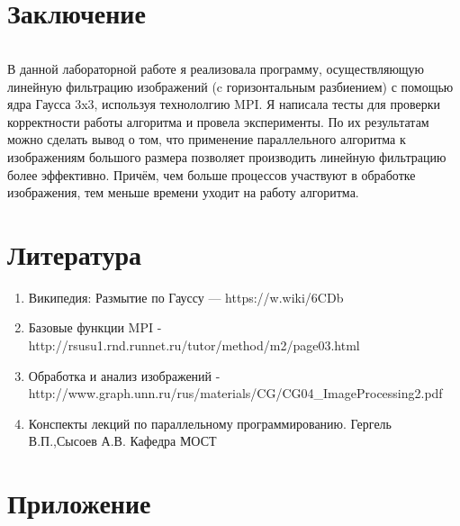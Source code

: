 \documentclass[12pt,a4paper]{article}
\begin{document}
\part*{Заключение}
\paragraph{}В данной лабораторной работе я реализовала программу, осуществляющую линейную фильтрацию изображений (c горизонтальным разбиением) с помощью ядра Гаусса 3x3, используя технололгию MPI. Я написала тесты для проверки корректности работы алгоритма и провела эксперименты. По их результатам можно сделать вывод о том, что применение параллельного алгоритма к изображениям большого размера позволяет производить линейную фильтрацию более эффективно. Причём, чем больше процессов участвуют в обработке изображения, тем меньше времени уходит на работу алгоритма.

\part*{Литература}
\begin{enumerate} 
\item Википедия: Размытие по Гауссу —  https://w.wiki/6CDb
\item Базовые функции MPI - http://rsusu1.rnd.runnet.ru/tutor/method/m2/page03.html
\item Обработка и анализ изображений - \\http://www.graph.unn.ru/rus/materials/CG/CG04\_ImageProcessing2.pdf
\item Конспекты лекций по параллельному программированию. Гергель В.П.,Сысоев А.В. Кафедра МОСТ
\end{enumerate} 

\part*{Приложение}
\end{document}
